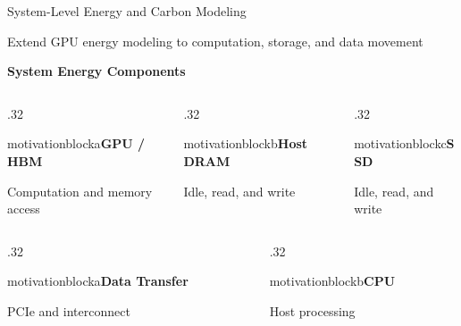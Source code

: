 \documentclass[aspectratio=169,10pt]{beamer}
\newcommand{\tagline}[1]{{\small\color{Muted}#1\par}\vspace{.1cm}}
\newcommand{\target}[1]{\hypertarget{#1}{}}
\begin{document}
\begin{frame}[t]{System-Level Energy and Carbon Modeling}
\target{main-energy}\tagline{Extend GPU energy modeling to computation, storage, and data movement}
\vspace{-.08cm}
{\small\bfseries\color{Accent}System Energy Components}\par\vspace{.035cm}
\begin{columns}[T,onlytextwidth]
\begin{column}{.32\textwidth}\begin{beamercolorbox}[wd=\linewidth,sep=.05cm,rounded=true]{motivationblocka}{\small\bfseries GPU / HBM}\par{\footnotesize Computation and memory access}\end{beamercolorbox}\end{column}
\begin{column}{.32\textwidth}\begin{beamercolorbox}[wd=\linewidth,sep=.05cm,rounded=true]{motivationblockb}{\small\bfseries Host DRAM}\par{\footnotesize Idle, read, and write}\end{beamercolorbox}\end{column}
\begin{column}{.32\textwidth}\begin{beamercolorbox}[wd=\linewidth,sep=.05cm,rounded=true]{motivationblockc}{\small\bfseries SSD}\par{\footnotesize Idle, read, and write}\end{beamercolorbox}\end{column}
\end{columns}
\vspace{.05cm}
\begin{columns}[T,onlytextwidth]
\begin{column}{.32\textwidth}\begin{beamercolorbox}[wd=\linewidth,sep=.05cm,rounded=true]{motivationblocka}{\small\bfseries Data Transfer}\par{\footnotesize PCIe and interconnect}\end{beamercolorbox}\end{column}
\begin{column}{.32\textwidth}\begin{beamercolorbox}[wd=\linewidth,sep=.05cm,rounded=true]{motivationblockb}{\small\bfseries CPU}\par{\footnotesize Host processing}\end{beamercolorbox}\end{column}

\end{columns}
\end{frame}
\end{document}
